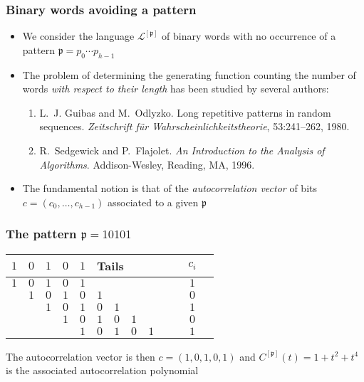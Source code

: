 \documentclass{beamer}
\begin{document}
\begin{frame} \frametitle{Binary words avoiding a pattern}
\begin{itemize}
\item We consider the language $\mathcal{L}^{[\mathfrak{p}]}$ of binary words
with no occurrence of a pattern  $\mathfrak{p}=p_0\cdots p_{h-1}$
\item  The problem of determining the generating function  counting
the number of words \emph{with respect to their length} has been studied
by several authors:

\begin{enumerate}
\item L.~J. Guibas and M.~Odlyzko.
 Long repetitive patterns in random sequences.
{\em Zeitschrift f\"{u}r Wahrscheinlichkeitstheorie}, 53:241--262,
  1980.
\item R.~Sedgewick and P.~Flajolet.
 {\em An {I}ntroduction to the {A}nalysis of {A}lgorithms}.
Addison-Wesley, Reading, MA, 1996.
\end{enumerate}
\item The fundamental notion is that of the \emph{autocorrelation vector} of
bits $c=(c_0,\ldots ,c_{h-1})$ associated to a given $\mathfrak{p}$
\end{itemize}
\end{frame}

\begin{frame} \frametitle{The pattern $\mathfrak{p}=10101$}
\begin{center}
\begin{tabular}{ccccc|cccccccc}
  $1$ & $0$ & $1$ & $0$ & $1$ & \multicolumn{6}{l}{Tails} & $c_{i}$  \\
  \hline
  $1$ & $0$ & $1$ & $0$ & $1$ & &   &   &   &   &   &    $1$ \\
    & $1$ & $0$ & $1$ & $0$ & $1$ &  &   &   &   &   &    $0$ \\
    &   & $1$ & $0$ & $1$ & $0$ & $1$ & &   &   &   &    $1$ \\
    &   &   & $1$ & $0$ & $1$ & $0$ & $1$ &  &   &   &    $0$ \\
    &   &   &   & $1$ & $0$ & $1$ & $0$ & $1$ &  &   &    $1$\\
\end{tabular}
\end{center}
The autocorrelation vector is then $c=(1,0,1,0,1)$ and  
$C^{[\mathfrak{p}]}(t)=1+t^{2}+t^{4}$ is the associated
autocorrelation polynomial
\end{frame}
\end{document}
